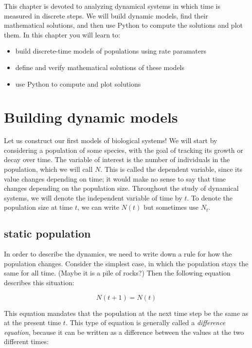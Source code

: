 \documentclass[
  letterpaper,
  DIV=11,
  numbers=noendperiod]{scrreprt}
\providecommand{\tightlist}{%
  \setlength{\itemsep}{0pt}\setlength{\parskip}{0pt}}\usepackage{longtable,booktabs,array}
\begin{document}
This chapter is devoted to analyzing dynamical systems in which time is
measured in discrete steps. We will build dynamic models, find their
mathematical solutions, and then use Python to compute the solutions and
plot them. In this chapter you will learn to:

\begin{itemize}
\tightlist
\item
  build discrete-time models of populations using rate paramaters
\item
  define and verify mathematical solutions of these models
\item
  use Python to compute and plot solutions
\end{itemize}

\hypertarget{building-dynamic-models}{%
\section{Building dynamic models}\label{building-dynamic-models}}

Let us construct our first models of biological systems! We will start
by considering a population of some species, with the goal of tracking
its growth or decay over time. The variable of interest is the number of
individuals in the population, which we will call \(N\). This is called
the dependent variable, since its value changes depending on time; it
would make no sense to say that time changes depending on the population
size. Throughout the study of dynamical systems, we will denote the
independent variable of time by \(t\). To denote the population size at
time \(t\), we can write \(N(t)\) but sometimes use \(N_t\).

\hypertarget{static-population}{%
\subsection{static population}\label{static-population}}

In order to describe the dynamics, we need to write down a rule for how
the population changes. Consider the simplest case, in which the
population stays the same for all time. (Maybe it is a pile of rocks?)
Then the following equation describes this situation:

\[
N(t+1) = N(t)
\]

This equation mandates that the population at the next time step be the
same as at the present time \(t\). This type of equation is generally
called a \emph{difference equation}, because it can be written as a
difference between the values at the two different times:
\end{document}
